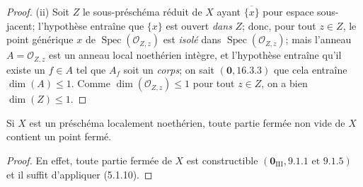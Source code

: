\begin{proof}
\textup{(ii)} Soit $Z$ le sous-préschéma réduit de $X$ ayant
$\overline{\{x\}}$ pour espace
sous-jacent; l'hypothèse entraîne que $\{x\}$ est ouvert \emph{dans} $Z$;
donc, pour tout $z\in Z$, le point générique $x$ de
$\operatorname{Spec}(\mathcal O_{Z,z})$ est \emph{isolé} dans
$\operatorname{Spec}(\mathcal O_{Z,z})$; mais l'anneau
$A=\mathcal O_{Z,z}$ est un anneau local noethérien intègre, et l'hypothèse
entraîne qu'il existe un $f\in A$ tel que $A_f$ soit un \emph{corps}; on sait
$(\mathbf{0},16.3.3)$ que cela entraîne $\dim(A)\leq1$. Comme
$\dim(\mathcal O_{Z,z})\leq1$ pour tout $z\in Z$, on a bien $\dim(Z)\leq1$.
\end{proof}

\begin{corollary}[5.1.11]
\label{IV.2.5.1.11-fr}
Si $X$ est un préschéma localement noethérien, toute partie fermée non vide de
$X$ contient un point fermé.
\end{corollary}

\begin{proof}
En effet, toute partie fermée de $X$ est constructible
$(\mathbf{0}_{\mathrm{III}},9.1.1\text{ et }9.1.5)$ et il suffit d'appliquer (5.1.10).
\end{proof}

